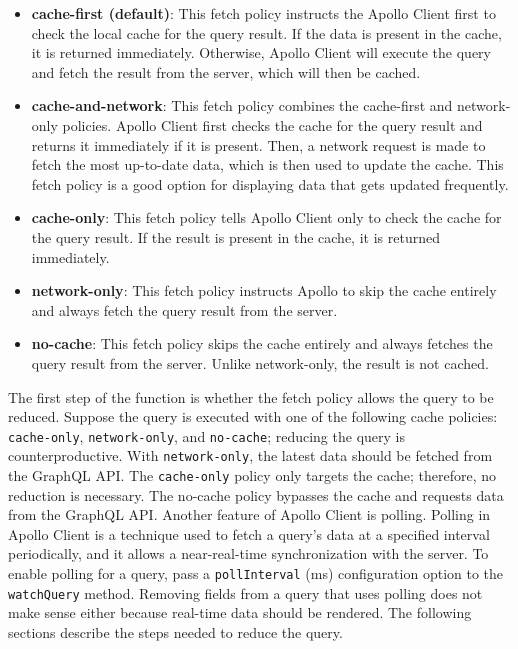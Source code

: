 \begin{itemize}
  \item \textbf{cache-first (default)}: This fetch policy instructs the Apollo Client first to check the local cache for the query result. If the data is present in the cache, it is returned immediately. Otherwise, Apollo Client will execute the query and fetch the result from the server, which will then be cached.
  \item \textbf{cache-and-network}: This fetch policy combines the cache-first and network-only policies. Apollo Client first checks the cache for the query result and returns it immediately if it is present. Then, a network request is made to fetch the most up-to-date data, which is then used to update the cache. This fetch policy is a good option for displaying data that gets updated frequently.
  \item \textbf{cache-only}: This fetch policy tells Apollo Client only to check the cache for the query result. If the result is present in the cache, it is returned immediately.
  \item \textbf{network-only}: This fetch policy instructs Apollo to skip the cache entirely and always fetch the query result from the server.
  \item \textbf{no-cache}: This fetch policy skips the cache entirely and always fetches the query result from the server. Unlike network-only, the result is not cached.
\end{itemize}

\noindent The first step of the function is whether the fetch policy allows the query to be reduced. Suppose the query is executed with one of the following cache policies: \texttt{cache-only}, \texttt{network-only}, and \texttt{no-cache}; reducing the query is counterproductive. With \texttt{network-only}, the latest data should be fetched from the GraphQL \ac{API}. The \texttt{cache-only} policy only targets the cache; therefore, no reduction is necessary. The no-cache policy bypasses the cache and requests data from the GraphQL \ac{API}. Another feature of Apollo Client is polling. Polling in Apollo Client is a technique used to fetch a query's data at a specified interval periodically, and it allows a near-real-time synchronization with the server. To enable polling for a query, pass a \texttt{pollInterval} (ms) configuration option to the \texttt{watchQuery} method. Removing fields from a query that uses polling does not make sense either because real-time data should be rendered. The following sections describe the steps needed to reduce the query.

